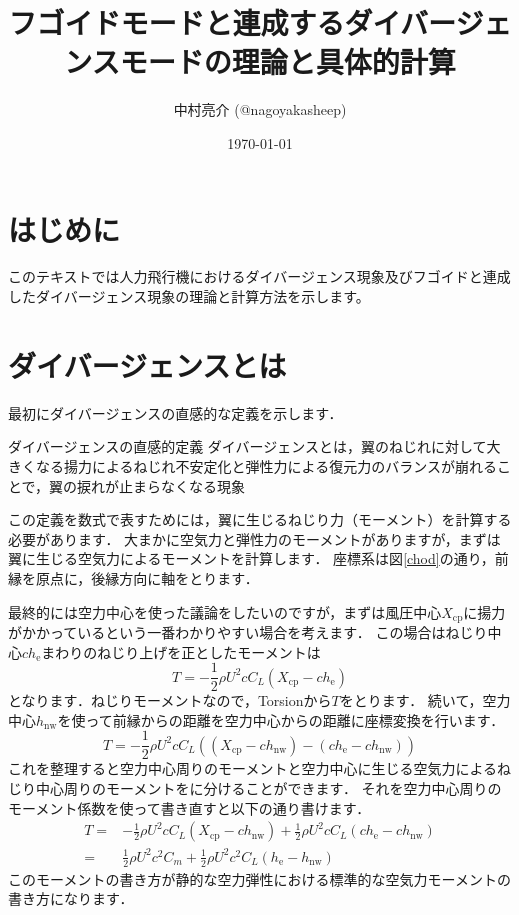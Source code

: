 \documentclass{jarticle}
\title{フゴイドモードと連成するダイバージェンスモードの理論と具体的計算}
\author{中村亮介 (@nagoyakasheep) }
\date{\today} %
\begin{document}
\maketitle

\section{はじめに}

このテキストでは人力飛行機におけるダイバージェンス現象及びフゴイドと連成したダイバージェンス現象の理論と計算方法を示します。


\section{ダイバージェンスとは}

最初にダイバージェンスの直感的な定義を示します．
\begin{itembox}[l]{ダイバージェンスの直感的定義}
    ダイバージェンスとは，翼のねじれに対して大きくなる揚力によるねじれ不安定化と弾性力による復元力のバランスが崩れることで，翼の捩れが止まらなくなる現象
\end{itembox}

この定義を数式で表すためには，翼に生じるねじり力（モーメント）を計算する必要があります．
大まかに空気力と弾性力のモーメントがありますが，まずは翼に生じる空気力によるモーメントを計算します．
座標系は図\ref{chod}の通り，前縁を原点に，後縁方向に軸をとります．

最終的には空力中心を使った議論をしたいのですが，まずは風圧中心$X_\mathrm{cp}$に揚力がかかっているという一番わかりやすい場合を考えます．
この場合はねじり中心$ch_\mathrm{e}$まわりのねじり上げを正としたモーメントは
\begin{equation}
    T = -\frac{1}{2}\rho U^2 c C_L (X_\mathrm{cp} - ch_\mathrm{e})
\end{equation}
となります．ねじりモーメントなので，Torsionから$T$をとります．
続いて，空力中心$h_\mathrm{nw}$を使って前縁からの距離を空力中心からの距離に座標変換を行います．
\begin{equation}
    T = -\frac{1}{2}\rho U^2 c C_L ((X_\mathrm{cp}-ch_\mathrm{nw}) - (ch_\mathrm{e}-ch_\mathrm{nw}))
\end{equation}
これを整理すると空力中心周りのモーメントと空力中心に生じる空気力によるねじり中心周りのモーメントをに分けることができます．
それを空力中心周りのモーメント係数を使って書き直すと以下の通り書けます．
\begin{equation}
    \begin{split}
        T =& -\frac{1}{2}\rho U^2 c C_L (X_\mathrm{cp}-ch_\mathrm{nw}) + \frac{1}{2}\rho U^2 c C_L  (ch_\mathrm{e}-ch_\mathrm{nw}) \\
          =& \frac{1}{2}\rho U^2 c^2 C_m + \frac{1}{2}\rho U^2 c^2 C_L  (h_\mathrm{e}-h_\mathrm{nw})
    \end{split}
\end{equation}
このモーメントの書き方が静的な空力弾性における標準的な空気力モーメントの書き方になります．
\end{document}
